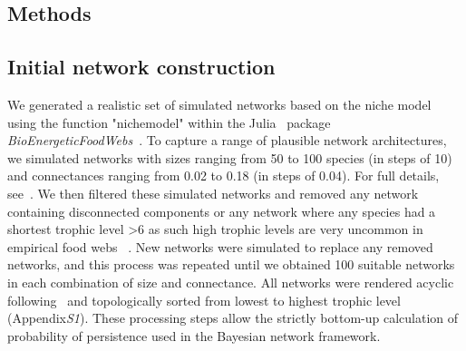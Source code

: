 \documentclass[12pt]{article}
\begin{document}
\begin{spacing}{2.0}
    	
\section*{Methods}

	\subsection*{Initial network construction}

		We generated a realistic set of simulated networks based on the niche model~\citep{Williams2000,Stouffer2007} using the function "nichemodel" within the Julia~\citep{Bezanson2017julia} package \emph{BioEnergeticFoodWebs}~\citep{bioenergfw}. 
		To capture a range of plausible network architectures, we simulated networks with sizes ranging from 50 to 100 species (in steps of 10) and connectances ranging from 0.02 to 0.18 (in steps of 0.04). 
		For full details, see~\citet{Cirtwill2021_inprep}.
        We then filtered these simulated networks and removed any network containing disconnected components
        or any network where any species had a shortest trophic level \textgreater6 as such high trophic levels are very uncommon in empirical food webs ~\citep{Riede2011}.
		New networks were simulated to replace any removed networks, and this process was repeated until we obtained 100 suitable networks in each combination of size and connectance.
		All networks were rendered acyclic following~\citet{Allesina2009} and topologically sorted from lowest to highest trophic level (Appendix\emph{S1}).
		These processing steps allow the strictly bottom-up calculation of probability of persistence used in the Bayesian network framework.
		
		

\end{spacing}
\end{document}
